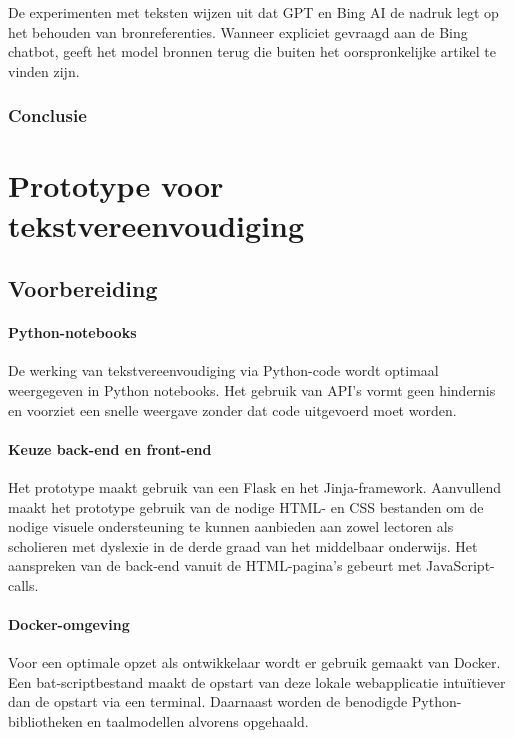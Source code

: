 De experimenten met teksten wijzen uit dat GPT en Bing AI de nadruk legt op het behouden van bronreferenties. Wanneer expliciet gevraagd aan de Bing chatbot, geeft het model bronnen terug die buiten het oorspronkelijke artikel te vinden zijn.

\subsection{Conclusie}

\chapter{Prototype voor tekstvereenvoudiging}

\section{Voorbereiding}

\subsubsection{Python-notebooks}

De werking van tekstvereenvoudiging via Python-code wordt optimaal weergegeven in Python notebooks. Het gebruik van API's vormt geen hindernis en voorziet een snelle weergave zonder dat code uitgevoerd moet worden. 

\subsubsection{Keuze back-end en front-end}

Het prototype maakt gebruik van een Flask en het Jinja-framework. Aanvullend maakt het prototype gebruik van de nodige HTML- en CSS bestanden om de nodige visuele ondersteuning te kunnen aanbieden aan zowel lectoren als scholieren met dyslexie in de derde graad van het middelbaar onderwijs. Het aanspreken van de back-end vanuit de HTML-pagina's gebeurt met JavaScript-calls.

\subsubsection{Docker-omgeving}

Voor een optimale opzet als ontwikkelaar wordt er gebruik gemaakt van Docker. Een bat-scriptbestand maakt de opstart van deze lokale webapplicatie intuïtiever dan de opstart via een terminal. Daarnaast worden de benodigde Python-bibliotheken en taalmodellen alvorens opgehaald.

